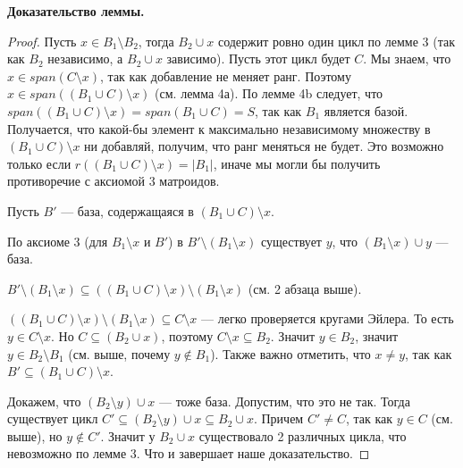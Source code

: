 {\bf Доказательство леммы.}
\begin{proof}

Пусть $x \in B_1 \setminus B_2$, тогда $B_2 \cup x$ содержит ровно один цикл по
лемме 3 (так как $B_2$ независимо, а $B_2 \cup x$ зависимо). Пусть этот цикл
будет $C$. Мы знаем, что $x \in span(C \setminus x)$, так как добавление не 
меняет ранг. Поэтому $x \in span((B_1 \cup C) \setminus x)$ (см. лемма 4а). По 
лемме 4b следует, что
$span((B_1 \cup C) \setminus x) = span(B_1 \cup C) = S$, так как $B_1$ является 
базой. Получается, что какой-бы элемент к максимально независимому множеству 
в $(B_1 \cup C) \setminus x$ ни добавляй, получим, что ранг меняться не будет. 
Это возможно только если $r((B_1 \cup C) \setminus x) = |B_1|$, иначе мы могли
бы получить противоречие с аксиомой 3 матроидов.

Пусть $B'$ --- база, содержащаяся в $(B_1 \cup C) \setminus x$.

По аксиоме 3 (для $B_1 \setminus x$ и $B'$) в $B' \setminus (B_1 \setminus x)$ существует $y$, что 
$(B_1 \setminus x) \cup y$ --- база. 

$B' \setminus (B_1 \setminus x) \subseteq ((B_1 \cup C) \setminus x) \setminus
(B_1 \setminus x)$ (см. 2 абзаца выше).

$((B_1 \cup C) \setminus x) \setminus (B_1 \setminus x) \subseteq C \setminus x$
--- легко проверяется кругами Эйлера. То есть $y \in C \setminus x$. Но $C 
\subseteq (B_2 \cup x)$, поэтому $C \setminus x \subseteq B_2$. Значит $y \in B_2$,
значит $y \in B_2 \setminus B_1$ (см. выше, почему $y \not\in B_1$). Также важно
отметить, что $x \neq y$, так как $B' \subseteq (B_1 \cup C)\setminus x$.

Докажем, что $(B_2 \setminus y) \cup x$ --- тоже база. Допустим, что это не так.
Тогда существует цикл
$C' \subseteq (B_2 \setminus y) \cup x \subseteq B_2 \cup x$. Причем $C' \neq C$,
так как $y \in C$ (см. выше), но $y \not\in C'$. Значит у $B_2 \cup x$ существовало 2 различных цикла,
что невозможно по лемме 3. Что и завершает наше доказательство.
\end{proof}

% 
